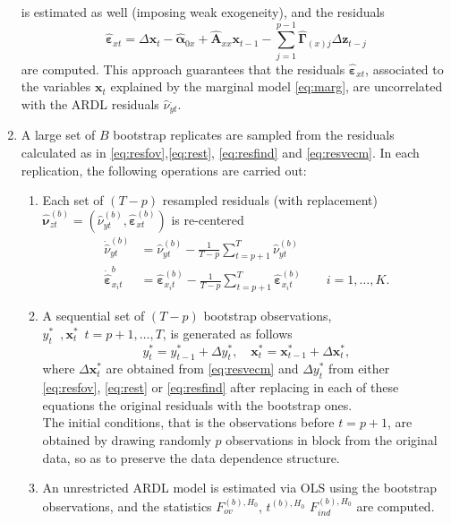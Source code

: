 \begin{enumerate}
\begin{equation}
\end{equation}
is estimated as well (imposing weak exogeneity), and the residuals  
\begin{equation}\label{eq:resvecm}
\widehat{\boldsymbol{\varepsilon}}_{xt}= \Delta\mathbf{x}_{t}-\widehat{\boldsymbol{\alpha}}_{0x}+\widehat{\mathbf{A}}_{xx}\mathbf{x}_{t-1}- \sum_{j=1}^{p-1}\widehat{\boldsymbol{\Gamma}}_{(x)j}\Delta\mathbf{z}_{t-j}
\end{equation}
 are computed. This approach guarantees that the residuals $\widehat{\boldsymbol{\varepsilon}}_{xt}$, associated to the variables $\mathbf{x}_{t}$ explained by the marginal model \eqref{eq:marg}, are uncorrelated with the ARDL residuals $\widehat{\nu}_{yt}^{.}$.
 \item A large set of $B$ bootstrap replicates are sampled from the residuals calculated as in \eqref{eq:resfov},\eqref{eq:rest}, \eqref{eq:resfind} and \eqref{eq:resvecm}. In each replication, the following operations are carried out:
\begin{enumerate}
 \item Each set of $(T-p)$ resampled residuals (with replacement) $\widehat{\boldsymbol{\nu}}_{zt}^{(b)}=(\widehat{\nu}_{yt}^{(b)},\widehat{\boldsymbol{\varepsilon}}_{xt}^{(b)})$ is re-centered \citep[see][]{davidson2005case}
\begin{align}
\dot{\widehat{\nu}}^{(b)}_{yt}&=\widehat{\nu}^{(b)}_{yt} -\frac{1}{T-p}\sum_{t=p+1}^{T}\widehat{\nu}^{(b)}_{yt} \label{eq:recentery} \\
\dot{\widehat{\boldsymbol{\varepsilon}}}^{b}_{x_{i}t}&=\widehat{\boldsymbol{\varepsilon}}^{(b)}_{x_{i}t}-\frac{1}{T-p}\sum_{t=p+1}^{T}\widehat{\boldsymbol{\varepsilon}}^{(b)}_{x_{i}t}\qquad i=1,\dots,K.\label{eq:recenterx}
\end{align}
\item A sequential set of $(T-p)$ bootstrap observations, $y^{*}_{t}\enspace, \mathbf{x}^{*}_{t}\enspace t=p+1,\dots,T$, is generated as follows
 \begin{equation}
 y^{*}_{t}=y^{*}_{t-1}+\Delta y^{*}_{t}, \enspace \enspace \mathbf{x}^{*}_{t}=\mathbf{x}^{*}_{t-1}+\Delta \mathbf{x}^{*}_{t},
\end{equation}
where $\Delta \mathbf{x}^{*}_{t}$ are obtained from \eqref{eq:resvecm} and  $\Delta y^{*}_{t}$  from either \eqref{eq:resfov}, \eqref{eq:rest} or \eqref{eq:resfind} after replacing in each of these equations the original residuals with the bootstrap ones. \\
The initial conditions, that is the observations before $t=p+1$, are obtained by drawing randomly $p$ observations in block from the original data, so as to preserve the data dependence structure.
\item An unrestricted ARDL model is estimated via OLS using the bootstrap observations, and the statistics $F_{ov}^{(b),H_0}$, $t^{(b),H_0}$ $F_{ind}^{(b),H_0}$ are computed.
\end{enumerate}


\end{enumerate}
